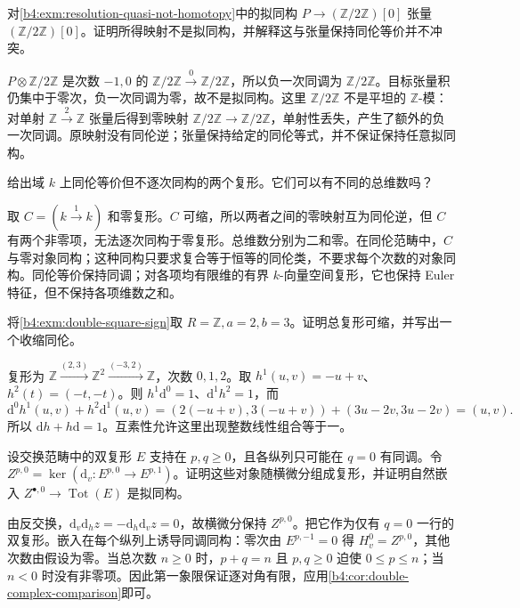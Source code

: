 \begin{exercise}\label{b4:ex:06-tensor-breaks-quasi}
	对\cref{b4:exm:resolution-quasi-not-homotopy}中的拟同构 \(P\to(\mathbb Z/2\mathbb Z)[0]\) 张量 \((\mathbb Z/2\mathbb Z)[0]\)。证明所得映射不是拟同构，并解释这与张量保持同伦等价并不冲突。
\end{exercise}
\begin{solution}
	\(P\otimes\mathbb Z/2\mathbb Z\) 是次数 \(-1,0\) 的 \(\mathbb Z/2\mathbb Z\xrightarrow0\mathbb Z/2\mathbb Z\)，所以负一次同调为 \(\mathbb Z/2\mathbb Z\)。目标张量积仍集中于零次，负一次同调为零，故不是拟同构。这里 \(\mathbb Z/2\mathbb Z\) 不是平坦的 \(\mathbb Z\)-模：对单射 \(\mathbb Z\xrightarrow2\mathbb Z\) 张量后得到零映射 \(\mathbb Z/2\mathbb Z\to\mathbb Z/2\mathbb Z\)，单射性丢失，产生了额外的负一次同调。原映射没有同伦逆；张量保持给定的同伦等式，并不保证保持任意拟同构。
\end{solution}

\begin{exercise}\label{b4:ex:06-homotopy-not-isomorphism}
	给出域 \(k\) 上同伦等价但不逐次同构的两个复形。它们可以有不同的总维数吗？
\end{exercise}
\begin{solution}
	取 \(C=(k\xrightarrow1k)\) 和零复形。\(C\) 可缩，所以两者之间的零映射互为同伦逆，但 \(C\) 有两个非零项，无法逐次同构于零复形。总维数分别为二和零。在同伦范畴中，\(C\) 与零对象同构；这种同构只要求复合等于恒等的同伦类，不要求每个次数的对象同构。同伦等价保持同调；对各项均有限维的有界 \(k\)-向量空间复形，它也保持 Euler 特征，但不保持各项维数之和。
\end{solution}

\begin{exercise}\label{b4:ex:06-coprime-square-contraction}
	将\cref{b4:exm:double-square-sign}取 \(R=\mathbb Z,a=2,b=3\)。证明总复形可缩，并写出一个收缩同伦。
\end{exercise}
\begin{solution}
	复形为 \(\mathbb Z\xrightarrow{(2,3)}\mathbb Z^2\xrightarrow{(-3,2)}\mathbb Z\)，次数 \(0,1,2\)。取 \(h^1(u,v)=-u+v\)、\(h^2(t)=(-t,-t)\)。则 \(h^1\mathrm{d}^0=1\)、\(\mathrm{d}^1h^2=1\)，而
	\[
		\mathrm{d}^0h^1(u,v)+h^2\mathrm{d}^1(u,v) =(2(-u+v),3(-u+v))+(3u-2v,3u-2v)=(u,v).
	\]
	所以 \(\mathrm{d}h+h\mathrm{d}=1\)。互素性允许这里出现整数线性组合等于一。
\end{solution}

\begin{exercise}\label{b4:ex:06-first-quadrant-edge}
	设交换范畴中的双复形 \(E\) 支持在 \(p,q\ge0\)，且各纵列只可能在 \(q=0\) 有同调。令 \(Z^{p,0}=\ker(\mathrm{d}_v:E^{p,0}\to E^{p,1})\)。证明这些对象随横微分组成复形，并证明自然嵌入 \(Z^{\bullet,0}\to\operatorname{Tot}(E)\) 是拟同构。
\end{exercise}
\begin{solution}
	由反交换，\(\mathrm{d}_v\mathrm{d}_hz=-\mathrm{d}_h\mathrm{d}_vz=0\)，故横微分保持 \(Z^{p,0}\)。把它作为仅有 \(q=0\) 一行的双复形。嵌入在每个纵列上诱导同调同构：零次由 \(E^{p,-1}=0\) 得 \(H^0_v=Z^{p,0}\)，其他次数由假设为零。当总次数 \(n\ge0\) 时，\(p+q=n\) 且 \(p,q\ge0\) 迫使 \(0\le p\le n\)；当 \(n<0\) 时没有非零项。因此第一象限保证逐对角有限，应用\cref{b4:cor:double-complex-comparison}即可。
\end{solution}

